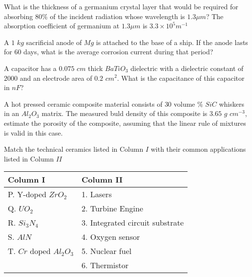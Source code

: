 \hfill{}

\item What is the thickness of a germanium crystal layer that would be required for absorbing $80\%$ of the incident radiation whose wavelength is $1.3 \mu m$? The absorption coefficient \brak{\alpha} of germanium at $1.3 \mu m$ is $3.3\times 10^5 m^{-1}$

\hfill{}

\item A $1$ $kg$ sacrificial anode of $Mg$  is attached to the base of a ship. If the anode lasts for $60$ days, what is the average corrosion current  during that period?

\hfill{}

\item A capacitor has a $0.075$ $cm$ thick $BaTiO_3$ dielectric with a dielectric constant of $2000$ and an electrode area of $0.2$ $cm^2$. What is the capacitance of this capacitor in $nF$?

\hfill{}

\item A hot pressed ceramic composite material consists of $30$ volume $\%$ $SiC$ whiskers in an $Al_{2}O_{3}$ matrix. The measured buld density of this composite is $3.65$ $g$ $cm^{-3}$, estimate the porosity \brak{\%} of the composite, assuming that the linear rule of mixtures is valid in this case.

\hfill{}

\item Match the technical ceramics listed in Column $I$ with their common applications listed in Column $II$
\\\begin{table}[h!]    
  \centering
  \begin{tabular}{| p{4cm} | p{6cm} |}
    \hline
    \textbf{Column I} & \textbf{Column II} \\
    \hline
    P. Y-doped $ZrO_2$ & 1. Lasers \\
    \hline
    Q. $UO_2$ & 2. Turbine Engine \\
    \hline
    R. $Si_{3}N_{4}$ & 3. Integrated circuit substrate \\
    \hline
    S. $AlN$ & 4. Oxygen sensor \\
    \hline
    T. $Cr$ doped $Al_{2}O_{3}$ & 5. Nuclear fuel \\
    \hline
    & 6. Thermistor \\
    \hline
\end{tabular}
\end{table}\\

